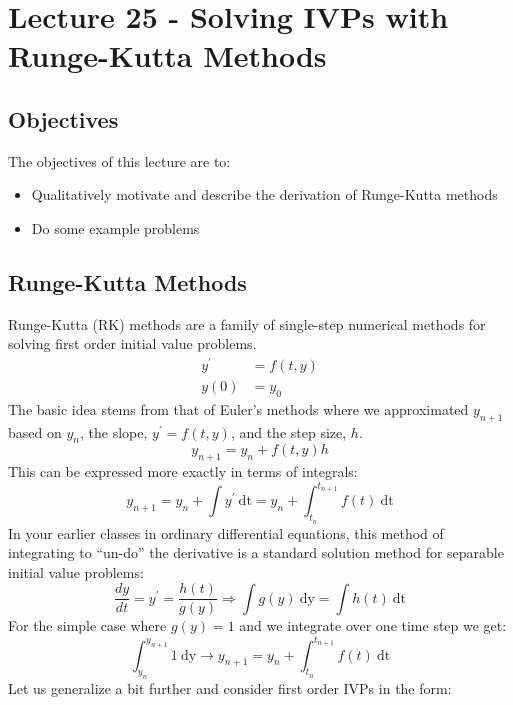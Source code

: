 \chapter{Lecture 25 - Solving IVPs with Runge-Kutta Methods}
\label{ch:lec25n}
\section{Objectives}
The objectives of this lecture are to:
\begin{itemize}
\item Qualitatively motivate and describe the derivation of Runge-Kutta methods
\item Do some example problems
\end{itemize}
\setcounter{lstannotation}{0}

\section{Runge-Kutta Methods}
Runge-Kutta (RK) methods are a family of single-step numerical methods for solving first order initial value problems.
\begin{align*}
y^{\prime} &= f(t,y) \\
y(0) &= y_0
\end{align*}
The basic idea stems from that of Euler's methods where we approximated $y_{n+1}$ based on $y_n$, the slope, $y^{\prime}=f(t,y)$, and the step size, $h$.
\begin{equation*}
y_{n+1} = y_n + f(t,y)h
\end{equation*}
This can be expressed more exactly in terms of integrals:
\begin{equation*}
y_{n+1}=y_n+\int y^{\prime} \ \text{dt} = y_n+\int_{t_{n}}^{t_{n+1}}  f(t) \ \text{dt}
\end{equation*}
In your earlier classes in ordinary differential equations, this method of integrating to ``un-do'' the derivative is a standard solution method for separable initial value problems:
\begin{equation*}
\frac{dy}{dt} = y^{\prime} = \frac{h(t)}{g(y)} \Rightarrow \int g(y) \ \text{dy} = \int h(t) \ \text{dt}
\end{equation*}
For the simple case where $g(y) = 1$ and we integrate over one time step we get:
\begin{equation*}
\int_{y_{n}}^{y_{n+1}} 1 \ \text{dy} \rightarrow y_{n+1} = y_n + \int_{t_n}^{t_{n+1}} f(t)\ \text{dt}
\end{equation*}
Let us generalize a bit further and consider first order IVPs in the form:
